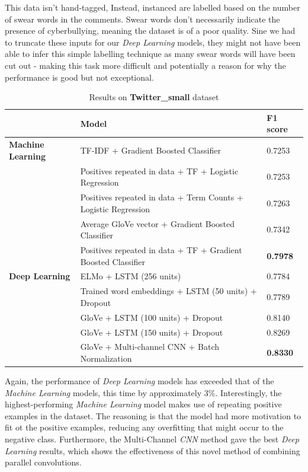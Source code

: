 \documentclass[12pt,a4paper]{article}
\begin{document}
This data isn't hand-tagged, Instead, instanced are labelled based on the number of swear words in the comments. Swear words don't necessarily indicate the presence of cyberbullying, meaning the dataset is of a poor quality. Sine we had to truncate these inputs for our \textit{Deep Learning} models, they might not have been able to infer this simple labelling technique as many swear words will have been cut out - making this task more difficult and potentially a reason for why the performance is good but not exceptional.

\begin{table}[H]
	\centering
	\vspace*{-12pt}
	\caption{Results on \textbf{Twitter\_small} dataset}
	\label{results2}
	\hspace*{-0.8cm}
	\begin{tabular}{p{3.4cm} p{11cm} p{2cm}} \hline\hline
		& \textbf{Model} & \textbf{F1 score}  \\ \hline
		\textbf{Machine Learning} & TF-IDF + Gradient Boosted Classifier & 0.7253 \\
		& Positives repeated in data + TF + Logistic Regression & 0.7253 \\
		& Positives repeated in data + Term Counts + Logistic Regression & 0.7263 \\
		& Average GloVe vector + Gradient Boosted Classifier & 0.7342 \\
		& Positives repeated in data + TF + Gradient Boosted Classifier & \textbf{0.7978} \\ \hline
		
		\textbf{Deep Learning} & ELMo + LSTM (256 units) & 0.7784 \\
		& Trained word embeddings + LSTM (50 units) + Dropout & 0.7789 \\
		& GloVe + LSTM (100 units) + Dropout & 0.8140 \\ 
		& GloVe + LSTM (150 units) + Dropout & 0.8269 \\
		& GloVe + Multi-channel CNN + Batch Normalization & \textbf{0.8330} \\ \hline
	\end{tabular}
\end{table}

Again, the performance of \textit{Deep Learning} models has exceeded that of the \textit{Machine Learning} models, this time by approximately 3\%. Interestingly, the highest-performing \textit{Machine Learning} model makes use of repeating positive examples in the dataset. The reasoning is that the model had more motivation to fit ot the positive examples, reducing any overfitting that might occur to the negative class. Furthermore, the Multi-Channel \textit{CNN} method gave the best \textit{Deep Learning} results, which shows the effectiveness of this novel method of combining parallel convolutions. 
\end{document}
